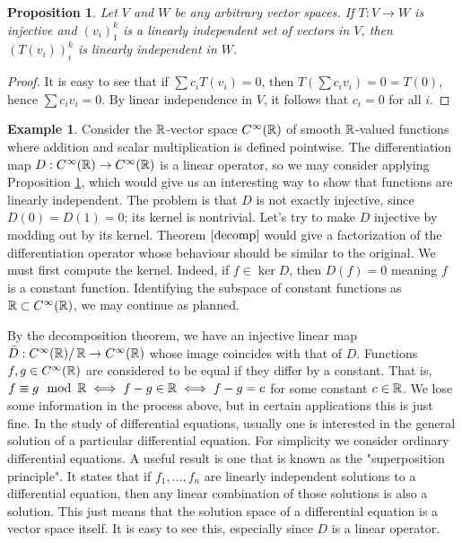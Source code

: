 \documentclass[12pt]{article}
\theoremstyle{definition}
\newtheorem{example}{Example}[section]
\theoremstyle{plain}
\newtheorem{proposition}[theorem] {Proposition}
\numberwithin{equation}{section}
\theoremstyle{definition}
\begin{document}
\begin{proposition} \label{inj_indp}
Let $ V $ and $ W $ be any arbitrary vector spaces. If $ T : V \to W $ is injective and $ (v_i)_1^k $ is a linearly independent set of vectors in $ V $, then $ (T(v_i))_i^k $ is linearly independent in $ W $.
\end{proposition}

\begin{proof}
It is easy to see that if $ \sum c_i T(v_i) = 0 $, then $ T( \sum c_i v_i) = 0 = T(0)$, hence $ \sum c_i v_i = 0 $. By linear independence in $ V $, it follows that $c_i = 0 $ for all $ i $.
\end{proof}

\begin{example}
Consider the $ \operatorname{\mathbb{R}} $-vector space $ C^\infty(\operatorname{\mathbb{R}}) $ of smooth $ \operatorname{\mathbb{R}} $-valued functions where addition and scalar multiplication is defined pointwise. The differentiation map $ D : C^\infty(\operatorname{\mathbb{R}}) \to C^\infty(\operatorname{\mathbb{R}}) $ is a linear operator, so we may consider applying Proposition \ref{inj_indp}, which would give us an interesting way to show that functions are linearly independent. The problem is that $ D $ is not exactly injective, since $ D(0) = D(1) = 0 $; its kernel is nontrivial. Let's try to make $ D $ injective by modding out by its kernel. Theorem $ \ref{decomp} $ would give a factorization of the differentiation operator whose behaviour should be similar to the original. We must first compute the kernel. Indeed, if $ f \in \ker D $, then $ D(f) = 0 $ meaning $ f $ is a constant function. Identifying the subspace of constant functions as $ \operatorname{\mathbb{R}} \subset C^\infty(\operatorname{\mathbb{R}}) $, we may continue as planned.

By the decomposition theorem, we have an injective linear map $ \bar{D} : C^\infty(\operatorname{\mathbb{R}}) / \operatorname{\mathbb{R}} \to C^\infty(\operatorname{\mathbb{R}}) $ whose image coincides with that of $ D $. Functions $ f, g \in C^\infty(\operatorname{\mathbb{R}}) $ are considered to be equal if they differ by a constant. That is, $ f \equiv g \mod {\operatorname{\mathbb{R}}} \iff f -g \in \operatorname{\mathbb{R}} \iff f - g = c$ for some constant $ c \in \operatorname{\mathbb{R}} $. We lose some information in the process above, but in certain applications this is just fine. In the study of differential equations, usually one is interested in the general solution of a particular differential equation. For simplicity we consider ordinary differential equations. A useful result is one that is known as the "superposition principle". It states that if $ f_1, \ldots, f_n $ are linearly independent solutions to a differential equation, then any linear combination of those solutions is also a solution. This just means that the solution space of a differential equation is a vector space itself. It is easy to see this, especially since $ D $ is a linear operator.


\end{example}
\end{document}

